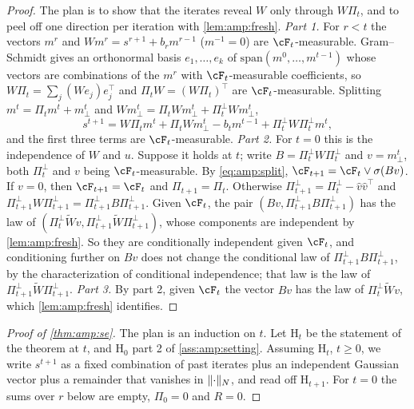 \begin{refsection}
\begin{proof}
The plan is to show that the iterates reveal $W$ only through $W\Pi_t$, and to peel off one direction per iteration with \cref{lem:amp:fresh}.
\emph{Part 1.} For $r<t$ the vectors $m^r$ and $Wm^r=s^{r+1}+b_rm^{r-1}$ ($m^{-1}=0$) are $\cF_t$-measurable. Gram--Schmidt gives an orthonormal basis $e_1,\dots,e_k$ of $\mathrm{span}(m^0,\dots,m^{t-1})$ whose vectors are combinations of the $m^r$ with $\cF_t$-measurable coefficients, so $W\Pi_t=\sum_j(We_j)e_j^\top$ and $\Pi_tW=(W\Pi_t)^\top$ are $\cF_t$-measurable. Splitting $m^t=\Pi_tm^t+m^t_\perp$ and $Wm^t_\perp=\Pi_tWm^t_\perp+\Pi_t^\perp Wm^t_\perp$,
\begin{equation}\label{eq:amp:split}
s^{t+1}=W\Pi_tm^t+\Pi_tWm^t_\perp-b_tm^{t-1}+\Pi_t^\perp W\Pi_t^\perp m^t,
\end{equation}
and the first three terms are $\cF_t$-measurable.
\emph{Part 2.} For $t=0$ this is the independence of $W$ and $u$. Suppose it holds at $t$; write $B=\Pi_t^\perp W\Pi_t^\perp$ and $v=m^t_\perp$, both $\Pi_t^\perp$ and $v$ being $\cF_t$-measurable. By \eqref{eq:amp:split}, $\cF_{t+1}=\cF_t\vee\sigma(Bv)$. If $v=0$, then $\cF_{t+1}=\cF_t$ and $\Pi_{t+1}=\Pi_t$. Otherwise $\Pi_{t+1}^\perp=\Pi_t^\perp-\hat v\hat v^\top$ and $\Pi_{t+1}^\perp W\Pi_{t+1}^\perp=\Pi_{t+1}^\perp B\Pi_{t+1}^\perp$. Given $\cF_t$, the pair $(Bv,\Pi^\perp_{t+1}B\Pi^\perp_{t+1})$ has the law of $(\Pi_t^\perp\tilde Wv,\Pi^\perp_{t+1}\tilde W\Pi^\perp_{t+1})$, whose components are independent by \cref{lem:amp:fresh}. So they are conditionally independent given $\cF_t$, and conditioning further on $Bv$ does not change the conditional law of $\Pi^\perp_{t+1}B\Pi^\perp_{t+1}$, by the characterization of conditional independence; that law is the law of $\Pi^\perp_{t+1}\tilde W\Pi^\perp_{t+1}$.
\emph{Part 3.} By part 2, given $\cF_t$ the vector $Bv$ has the law of $\Pi_t^\perp\tilde Wv$, which \cref{lem:amp:fresh} identifies.
\end{proof}

\begin{proof}[Proof of \cref{thm:amp:se}]
The plan is an induction on $t$. Let $\mathrm H_t$ be the statement of the theorem at $t$, and $\mathrm H_0$ part 2 of \cref{ass:amp:setting}. Assuming $\mathrm H_t$, $t\ge0$, we write $s^{t+1}$ as a fixed combination of past iterates plus an independent Gaussian vector plus a remainder that vanishes in $\lVert \cdot\rVert_N$, and read off $\mathrm H_{t+1}$. For $t=0$ the sums over $r$ below are empty, $\Pi_0=0$ and $R=0$.


\end{proof}
\end{refsection}
